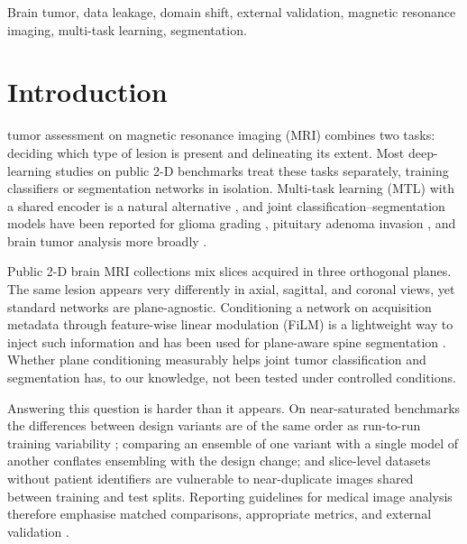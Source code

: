 \documentclass[journal]{IEEEtran}
\begin{document}
\begin{IEEEkeywords}
Brain tumor, data leakage, domain shift, external validation, magnetic resonance imaging, multi-task learning, segmentation.
\end{IEEEkeywords}

\section{Introduction}
 tumor assessment on magnetic resonance imaging (MRI) combines two tasks: deciding which type of lesion is present and delineating its extent. Most deep-learning studies on public 2-D benchmarks treat these tasks separately, training classifiers \cite{cheng2015enhanced,fateh2026brisc,ahmed2026enhancing} or segmentation networks \cite{ronneberger2015u,fateh2026brisc} in isolation. Multi-task learning (MTL) with a shared encoder is a natural alternative \cite{caruana1997multitask,zhang2018overview}, and joint classification--segmentation models have been reported for glioma grading \cite{chen2025cooperative}, pituitary adenoma invasion \cite{rui2025automatic}, and brain tumor analysis more broadly \cite{nazir2024end}.

Public 2-D brain MRI collections mix slices acquired in three orthogonal planes. The same lesion appears very differently in axial, sagittal, and coronal views, yet standard networks are plane-agnostic. Conditioning a network on acquisition metadata through feature-wise linear modulation (FiLM) \cite{perez2018film} is a lightweight way to inject such information and has been used for plane-aware spine segmentation \cite{stelzner2024recognition}. Whether plane conditioning measurably helps joint tumor classification and segmentation has, to our knowledge, not been tested under controlled conditions.

Answering this question is harder than it appears. On near-saturated benchmarks the differences between design variants are of the same order as run-to-run training variability \cite{bouthillier2021accounting}; comparing an ensemble of one variant with a single model of another conflates ensembling \cite{lakshminarayanan2017simple} with the design change; and slice-level datasets without patient identifiers are vulnerable to near-duplicate images shared between training and test splits. Reporting guidelines for medical image analysis therefore emphasise matched comparisons, appropriate metrics, and external validation \cite{maierhein2024metrics,mongan2020claim}.
\end{document}
